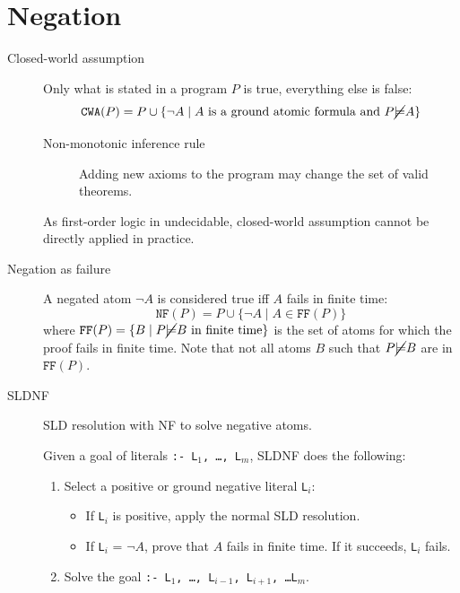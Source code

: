 \section{Negation}

\begin{description}
    \item[Closed-world assumption] 
        Only what is stated in a program $P$ is true, everything else is false:
        \[ \texttt{CWA}(P) = P \cup \{ \lnot A \mid A \text{ is a ground atomic formula and } P \cancel{\models} A \} \]

        \begin{description}
            \item[Non-monotonic inference rule]
                Adding new axioms to the program may change the set of valid theorems. 
        \end{description}

        As first-order logic in undecidable, closed-world assumption cannot be directly applied in practice.

    \item[Negation as failure] 
        A negated atom $\lnot A$ is considered true iff $A$ fails in finite time:
        \[ \texttt{NF}(P) = P \cup \{ \lnot A \mid A \in \texttt{FF}(P) \} \]
        where $\texttt{FF}(P) = \{ B \mid P \cancel{\models} B \text{ in finite time} \}$ 
        is the set of atoms for which the proof fails in finite time.
        Note that not all atoms $B$ such that $P \cancel{\models} B$ are in $\texttt{FF}(P)$.

    \item[SLDNF] 
        SLD resolution with NF to solve negative atoms.
        
        Given a goal of literals \texttt{:- L$_1$, \dots, L$_m$}, SLDNF does the following:
        \begin{enumerate}
            \item Select a positive or ground negative literal \texttt{L$_i$}:
                \begin{itemize}
                    \item If \texttt{L$_i$} is positive, apply the normal SLD resolution.
                    \item If \texttt{L$_i$} = $\lnot A$, prove that $A$ fails in finite time. 
                        If it succeeds, \texttt{L$_i$} fails.
                \end{itemize}
            \item Solve the goal \texttt{:- L$_1$, \dots, L$_{i-1}$, L$_{i+1}$, \dots  L$_m$}.
        \end{enumerate}


\end{description}
